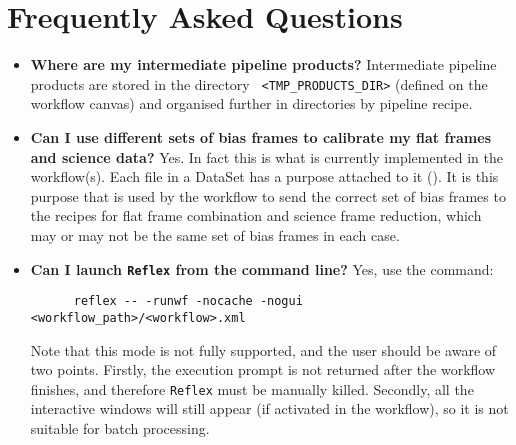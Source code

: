 \section{Frequently Asked Questions}

\begin{itemize}
   \item {\bf Where are my intermediate pipeline products?}
   Intermediate pipeline products are stored in the directory {\tt
   \verb|<|TMP\_PRODUCTS\_DIR\verb|>|} (defined on the workflow canvas)
   and organised further in directories by pipeline recipe.


        

   \item {\bf Can I use different sets of bias frames to calibrate my
          flat frames and science data?}
   Yes. In fact this is what is currently implemented in the workflow(s).
   Each file in a DataSet has a purpose attached to it (\cite{REFLEXMAN}).
   It is this purpose that is used by the workflow to send the correct
   set of bias frames to the recipes for flat frame combination and 
   science frame reduction, which may or may not be the same set of bias 
   frames in each case.

   \item {\bf Can I launch {\tt Reflex} from the command line?}
   Yes, use the command:
      \begin{verbatim}
      reflex -- -runwf -nocache -nogui <workflow_path>/<workflow>.xml
      \end{verbatim}
   Note that this mode is not fully supported, and the user should be 
   aware of two points. Firstly, the execution prompt is not returned after the
   workflow finishes, and therefore {\tt Reflex} must be manually killed.
   Secondly, all the interactive windows will still appear (if activated in the
   workflow), so it is not suitable for batch processing.
        

\end{itemize}

